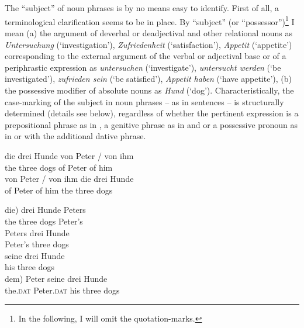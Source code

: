 \documentclass[output=paper,colorlinks,citecolor=brown]{langscibook}
\begin{document}
\section{} \label{sec:zi91:1}

The “subject” of noun phrases is by no means easy to identify. First of all, a terminological clarification seems to be in place. By “subject” (or “possessor”)\footnote{In the following, I will omit the quotation-marks.} I mean (a) the argument of deverbal or deadjectival and other relational nouns as \textit{Untersuchung} (‘investigation’), \textit{Zufriedenheit} (‘satisfaction’), \textit{Appetit} (‘appetite’) corresponding to the external argument of the verbal or adjectival base or of a periphrastic expression as \textit{untersuchen} (‘investigate’), \textit{untersucht werden} (‘be investigated’), \textit{zufrieden sein} (‘be satisfied’), \textit{Appetit haben} (‘have appetite’), (b) the possessive modifier of absolute nouns as \textit{Hund} (‘dog’). Characteristically, the case-marking of the subject in noun phrases -- as in sentences -- is structurally determined (details see below), regardless of whether the pertinent expression is a prepositional phrase as in , a genitive phrase as in  and  or a possessive pronoun as in  or  with the additional dative phrase.

\ea \label{ex:zi91:1}
   \ea \label{ex:zi91:1a} 
    \gll die drei Hunde von Peter / von ihm\\
        the three dogs of Peter {} of him\\
    
   \ex \label{ex:zi91:1b} 
   \gll von Peter / von ihm die drei Hunde\\
   of Peter {} of him the three dogs\\
   \z
  
    
\ex \label{ex:zi91:2}
    \ea \label{ex:zi91:2a}
    \gll \minsp{(} die) drei Hunde Peters\\
        {} the three dogs Peter's\\
        
    \ex \label{ex:zi91:2b} 
    \gll Peters drei Hunde\\
    Peter's three dogs\\
    
    \ex \label{ex:zi91:2c} 
    \gll seine drei Hunde\\
    his three dogs\\
    \z
\ex \label{ex:zi91:3} 
    \gll \minsp{(} dem) Peter seine drei Hunde\\
    {} the.\textsc{dat} Peter.\textsc{dat} his three dogs\\
\z
\end{document}
